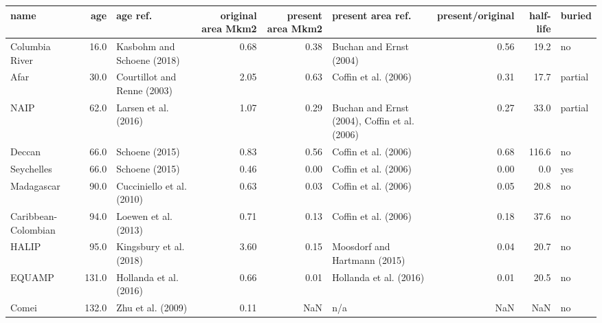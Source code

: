 \begin{tabular}{lrlrrlrrl}
\toprule
                name &    age &                     age ref. &  original area Mkm2 &  present area Mkm2 &                                 present area ref. &  present/original &  half-life &   buried \\
\midrule
      Columbia River &   16.0 &   Kasbohm and Schoene (2018) &                0.68 &               0.38 &                           Buchan and Ernst (2004) &              0.56 &       19.2 &       no \\
                Afar &   30.0 &  Courtillot and Renne (2003) &                2.05 &               0.63 &                              Coffin et al. (2006) &              0.31 &       17.7 &  partial \\
                NAIP &   62.0 &         Larsen et al. (2016) &                1.07 &               0.29 &     Buchan and Ernst (2004), Coffin et al. (2006) &              0.27 &       33.0 &  partial \\
              Deccan &   66.0 &               Schoene (2015) &                0.83 &               0.56 &                              Coffin et al. (2006) &              0.68 &      116.6 &       no \\
          Seychelles &   66.0 &               Schoene (2015) &                0.46 &               0.00 &                              Coffin et al. (2006) &              0.00 &        0.0 &      yes \\
          Madagascar &   90.0 &    Cucciniello et al. (2010) &                0.63 &               0.03 &                              Coffin et al. (2006) &              0.05 &       20.8 &       no \\
 Caribbean-Colombian &   94.0 &         Loewen et al. (2013) &                0.71 &               0.13 &                              Coffin et al. (2006) &              0.18 &       37.6 &       no \\
               HALIP &   95.0 &      Kingsbury et al. (2018) &                3.60 &               0.15 &                      Moosdorf and Hartmann (2015) &              0.04 &       20.7 &       no \\
              EQUAMP &  131.0 &       Hollanda et al. (2016) &                0.66 &               0.01 &                            Hollanda et al. (2016) &              0.01 &       20.5 &       no \\
               Comei &  132.0 &            Zhu et al. (2009) &                0.11 &                NaN &                                               n/a &               NaN &        NaN &       no \\

\end{tabular}
